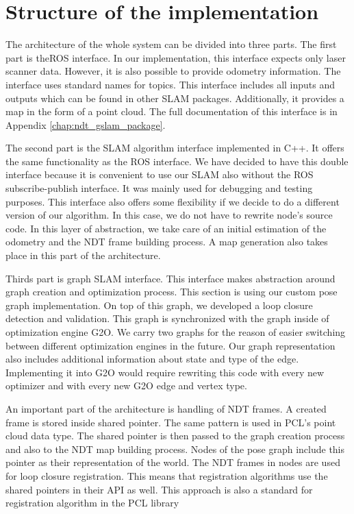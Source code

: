 \section{Structure of the implementation}
 The architecture of the whole system can be divided into three parts. The first part is the\gls{ROS} interface. In our implementation, this interface expects only laser scanner data. However, it is also possible to provide odometry information.  The interface uses standard names for topics. This interface includes all inputs and outputs which can be found in other SLAM packages. Additionally, it provides a map in the form of a point cloud. The full documentation of this interface is in Appendix \ref{chap:ndt_gslam_package}.
 
 The second part is the SLAM algorithm interface implemented in C++. It offers the same functionality as the ROS interface. We have decided to have this double interface because it is convenient to use our SLAM also without the \gls{ROS} subscribe-publish interface. It was mainly used for debugging and testing purposes. This interface also offers some flexibility if we decide to do a different version of our algorithm. In this case, we do not have to rewrite node's source code. In this layer of abstraction, we take care of an initial estimation of the odometry and the \gls{NDT} frame building process. A map generation also takes place in this part of the architecture.
 
 Thirds part is graph \gls{SLAM} interface. This interface makes abstraction around graph creation and optimization process. This section is using our custom pose graph implementation. On top of this graph, we developed a loop closure detection and validation. This graph is synchronized with the graph inside of optimization engine G2O. We carry two graphs for the reason of easier switching between different optimization engines in the future. Our graph representation also includes additional information about state and type of the edge. Implementing it into G2O would require rewriting this code with every new optimizer and with every new G2O edge and vertex type.
 
 An important part of the architecture is handling of \gls{NDT} frames. A created frame is stored inside shared pointer. The same pattern is used in \gls{PCL}'s point cloud data type. The shared pointer is then passed to the graph creation process and also to the \gls{NDT} map building process. Nodes of the pose graph include this pointer as their representation of the world. The \gls{NDT} frames in nodes are used for loop closure registration. This means that registration algorithms use the shared pointers in their API as well. This approach is also a standard for registration algorithm in the \gls{PCL} library
 
